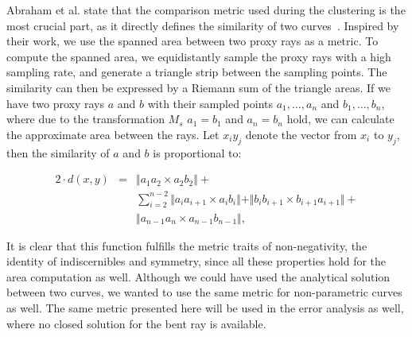 \documentclass[journal]{vgtc}                %
\begin{document}
Abraham et al. state that the comparison metric used during the clustering is the most crucial part, as it directly defines the similarity of two curves~\cite{abraham03clustering}. Inspired by their work, we use the spanned area between two proxy rays as a metric. To compute the spanned area, we equidistantly sample the proxy rays with a high sampling rate, and generate a triangle strip between the sampling points. The similarity can then be expressed by a Riemann sum of the triangle areas. If we have two proxy rays $a$ and $b$ with their sampled points $a_1,\dots,a_n$ and $b_1,\dots,b_n$, where due to the transformation $M_s$ $a_1=b_1$ and $a_n=b_n$ hold, we can calculate the approximate area between the rays. Let $x_iy_j$ denote the vector from $x_i$ to $y_j$, then the similarity of $a$ and $b$ is proportional to:

\begin{eqnarray*}
2\cdot d(x,y) &=& \Vert a_1a_2 \times a_2b_2\Vert + \\
&& \sum_{i=2}^{n-2}\Vert a_ia_{i+1} \times a_ib_i \Vert + \Vert b_ib_{i+1} \times b_{i+1}a_{i+1}\Vert + \\
&& \Vert a_{n-1}a_n \times a_{n-1}b_{n-1}\Vert,
\end{eqnarray*}

It is clear that this function fulfills the metric traits of non-negativity, the identity of indiscernibles and symmetry, since all these properties hold for the area computation as well. Although we could have used the analytical solution between two curves, we wanted to use the same metric for non-parametric curves as well. The same metric presented here will be used in the error analysis as well, where no closed solution for the bent ray is available.
\end{document}
